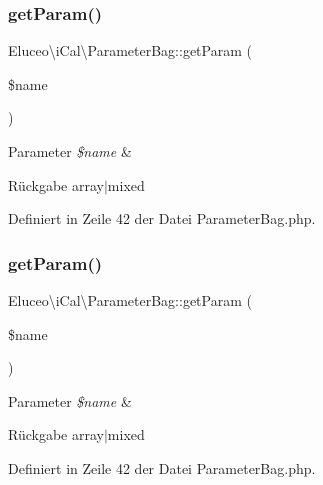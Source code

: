 \subsubsection{\texorpdfstring{get\+Param()}{getParam()}\hspace{0.1cm}{\footnotesize\ttfamily [2/3]}}
{\footnotesize\ttfamily Eluceo\textbackslash{}i\+Cal\textbackslash{}\+Parameter\+Bag\+::get\+Param (\begin{DoxyParamCaption}\item[{}]{\$name }\end{DoxyParamCaption})}


\begin{DoxyParams}{Parameter}
{\em \$name} & \\
\hline
\end{DoxyParams}
\begin{DoxyReturn}{Rückgabe}
array$\vert$mixed 
\end{DoxyReturn}


Definiert in Zeile 42 der Datei Parameter\+Bag.\+php.

\mbox{\label{class_eluceo_1_1i_cal_1_1_parameter_bag_add3451bf728adf15b29f69a51b2bff08}} 
\subsubsection{\texorpdfstring{get\+Param()}{getParam()}\hspace{0.1cm}{\footnotesize\ttfamily [3/3]}}
{\footnotesize\ttfamily Eluceo\textbackslash{}i\+Cal\textbackslash{}\+Parameter\+Bag\+::get\+Param (\begin{DoxyParamCaption}\item[{}]{\$name }\end{DoxyParamCaption})}


\begin{DoxyParams}{Parameter}
{\em \$name} & \\
\hline
\end{DoxyParams}
\begin{DoxyReturn}{Rückgabe}
array$\vert$mixed 
\end{DoxyReturn}


Definiert in Zeile 42 der Datei Parameter\+Bag.\+php.

